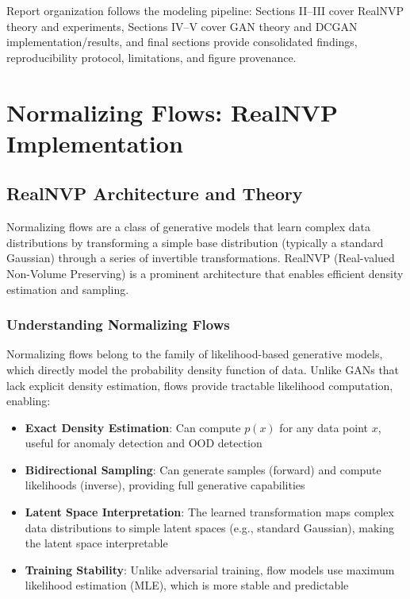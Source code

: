 \documentclass[conference,12pt]{IEEEtran}
\begin{document}
Report organization follows the modeling pipeline: Sections II--III cover RealNVP theory and experiments, Sections IV--V cover GAN theory and DCGAN implementation/results, and final sections provide consolidated findings, reproducibility protocol, limitations, and figure provenance.

\section{Normalizing Flows: RealNVP Implementation}

\subsection{RealNVP Architecture and Theory}

Normalizing flows are a class of generative models that learn complex data distributions by transforming a simple base distribution (typically a standard Gaussian) through a series of invertible transformations. RealNVP (Real-valued Non-Volume Preserving) is a prominent architecture that enables efficient density estimation and sampling.

\subsubsection{Understanding Normalizing Flows}

Normalizing flows belong to the family of likelihood-based generative models, which directly model the probability density function of data. Unlike GANs that lack explicit density estimation, flows provide tractable likelihood computation, enabling:

\begin{itemize}
    \item \textbf{Exact Density Estimation}: Can compute $p(x)$ for any data point $x$, useful for anomaly detection and OOD detection
    \item \textbf{Bidirectional Sampling}: Can generate samples (forward) and compute likelihoods (inverse), providing full generative capabilities
    \item \textbf{Latent Space Interpretation}: The learned transformation maps complex data distributions to simple latent spaces (e.g., standard Gaussian), making the latent space interpretable
    \item \textbf{Training Stability}: Unlike adversarial training, flow models use maximum likelihood estimation (MLE), which is more stable and predictable
\end{itemize}
\end{document}
